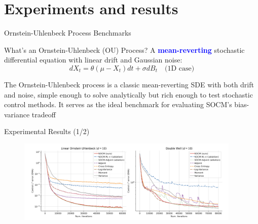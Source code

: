 \documentclass[aspectratio=169,xcolor=dvipsnames]{beamer}
\begin{document}


\section{Experiments and results}

\begin{frame}[allowframebreaks]{Ornstein-Uhlenbeck Process Benchmarks}
    \vspace{-0.3cm}
    
    \begin{block}{What's an Ornstein-Uhlenbeck (OU) Process?}
        A \textcolor{blue}{\textbf{mean-reverting}} stochastic differential equation with linear drift and Gaussian noise:
        $$dX_t = \theta(\mu - X_t) dt + \sigma dB_t \quad \text{(1D case)}$$

        The Ornstein-Uhlenbeck process is a classic mean-reverting SDE with both drift and noise, simple enough to solve analytically but rich enough to test stochastic control methods. It serves as the ideal benchmark for evaluating SOCM's bias-variance tradeoff
    \end{block}
    
    \vspace{0.8cm}
    
\end{frame}

\begin{frame}{Experimental Results (1/2)}
    \begin{figure}
        \centering
        \includegraphics[width=0.95\textwidth]{figures/plots_1.png}
    \end{figure}
\end{frame}
\end{document}
